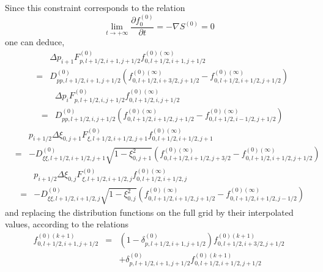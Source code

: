 Since this constraint corresponds to the relation
\begin{equation}
\lim_{t\rightarrow +\infty }\frac{\partial f_{0}^{\left( 0\right) }}{
\partial t}=-\nabla S^{\left( 0\right) }=0
\end{equation}
one can deduce,
\begin{eqnarray}
&&\Delta p_{i+1}F_{p,l+1/2,i+1,j+1/2}^{\left( 0\right)
}f_{0,l+1/2,i+1,j+1/2}^{\left( 0\right) (\infty )}  \nonumber \\
&=&D_{pp,l+1/2,i+1,j+1/2}^{\left( 0\right) }\left(
f_{0,l+1/2,i+3/2,j+1/2}^{\left( 0\right) (\infty
)}-f_{0,l+1/2,i+1/2,j+1/2}^{\left( 0\right) (\infty )}\right)
\end{eqnarray}
\begin{eqnarray}
&&\Delta p_{i}F_{p,l+1/2,i,j+1/2}^{\left( 0\right)
}f_{0,l+1/2,i,j+1/2}^{\left( 0\right) (\infty )}  \nonumber \\
&=&D_{pp,l+1/2,i,j+1/2}^{\left( 0\right) }\left(
f_{0,l+1/2,i+1/2,j+1/2}^{\left( 0\right) (\infty
)}-f_{0,l+1/2,i-1/2,j+1/2}^{\left( 0\right) (\infty )}\right)
\end{eqnarray}
\begin{eqnarray}
&&p_{i+1/2}\Delta \xi _{0,j+1}F_{\xi ,l+1/2,i+1/2,j+1}^{\left( 0\right)
}f_{0,l+1/2,i+1/2,j+1}^{\left( 0\right) (\infty )}  \nonumber \\
&=&-D_{\xi \xi ,l+1/2,i+1/2,j+1}^{\left( 0\right) }\sqrt{1-\xi _{0,j+1}^{2}}%
\left( f_{0,l+1/2,i+1/2,j+3/2}^{\left( 0\right) (\infty
)}-f_{0,l+1/2,i+1/2,j+1/2}^{\left( 0\right) (\infty )}\right)
\end{eqnarray}
\begin{eqnarray}
&&p_{i+1/2}\Delta \xi _{0,j}F_{\xi ,l+1/2,i+1/2,j}^{\left( 0\right)
}f_{0,l+1/2,i+1/2,j}^{\left( 0\right) (\infty )}  \nonumber \\
&=&-D_{\xi \xi ,l+1/2,i+1/2,j}^{\left( 0\right) }\sqrt{1-\xi _{0,j}^{2}}%
\left( f_{0,l+1/2,i+1/2,j+1/2}^{\left( 0\right) (\infty
)}-f_{0,l+1/2,i+1/2,j-1/2}^{\left( 0\right) (\infty )}\right)
\end{eqnarray}
and replacing the distribution functions on the full grid by their
interpolated values, according to the relations
\begin{eqnarray}
f_{0,l+1/2,i+1,j+1/2}^{\left( 0\right) (k+1)} &=&\left( 1-\delta
_{p,l+1/2,i+1,j+1/2}^{\left( 0\right) }\right)
f_{0,l+1/2,i+3/2,j+1/2}^{\left( 0\right) (k+1)}  \nonumber \\
&&+\delta _{p,l+1/2,i+1,j+1/2}^{\left( 0\right)
}f_{0,l+1/2,i+1/2,j+1/2}^{\left( 0\right) (k+1)}
\end{eqnarray}

